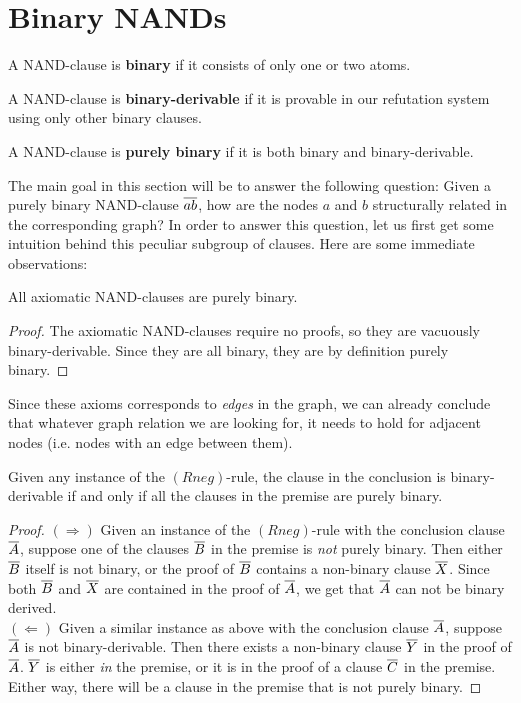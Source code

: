 \section{Binary NANDs}
\label{sec:Binary NANDs}
\begin{definition}
  A NAND-clause is \textbf{binary} if it consists of only one or two atoms.
\end{definition}
\begin{definition}
  A NAND-clause is \textbf{binary-derivable} if it is provable in our refutation system using only other binary clauses.
\end{definition}
\begin{definition}
  A NAND-clause is \textbf{purely binary} if it is both binary and binary-derivable.
\end{definition}
The main goal in this section will be to answer the following question:
Given a purely binary NAND-clause $\ol{ab}$, how are the nodes $a$ and $b$ structurally related in the corresponding graph?
In order to answer this question, let us first get some intuition behind this peculiar subgroup of clauses.  Here are some immediate observations:
\begin{lemma}
  All axiomatic NAND-clauses are purely binary.
\end{lemma}
\begin{proof}
  The axiomatic NAND-clauses require no proofs, so they are vacuously binary-derivable.
  Since they are all binary, they are by definition purely binary.
\end{proof}
Since these axioms corresponds to \textit{edges} in the graph, we can already conclude that whatever graph relation we are looking for, it needs to hold for adjacent nodes (i.e. nodes with an edge between them).
\begin{lemma}
  Given any instance of the $(Rneg)$-rule, the clause in the conclusion is binary-derivable if and only if all the clauses in the premise are purely binary.
\end{lemma}
\begin{proof}
  $(\Rightarrow)$ Given an instance of the $(Rneg)$-rule with the conclusion clause $\ol{A}$, suppose one of the clauses $\ol{B}$ in the premise is \textit{not} purely binary.
  Then either $\ol{B}$ itself is not binary, or the proof of $\ol{B}$ contains a non-binary clause $\ol{X}$.
  Since both $\ol{B}$ and $\ol{X}$ are contained in the proof of $\ol{A}$, we get that $\ol{A}$ can not be binary derived.\\
  $(\Leftarrow)$ Given a similar instance as above with the conclusion clause $\ol{A}$, suppose $\ol{A}$ is not binary-derivable.
  Then there exists a non-binary clause $\ol{Y}$ in the proof of $\ol{A}$.
  $\ol{Y}$ is either \textit{in} the premise, or it is in the proof of a clause $\ol{C}$ in the premise.  Either way, there will be a clause in the premise that is not purely binary.
\end{proof}
